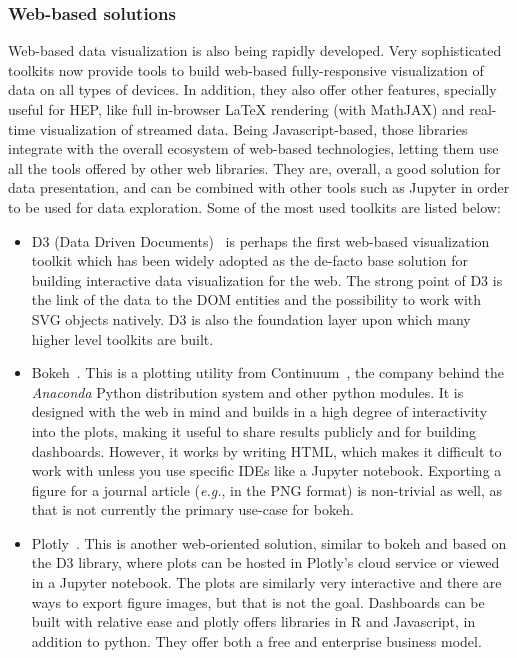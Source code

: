 \documentclass[12pt,a4paper]{article}
\begin{document}
\hypertarget{stats-web}{%
\subsubsection{Web-based solutions}\label{stats-web}}

Web-based data visualization is also being rapidly developed. Very sophisticated toolkits now provide tools to build web-based
fully-responsive visualization of data on all types of devices. In addition, they also offer other features, specially useful
for HEP, like full in-browser LaTeX rendering (with MathJAX) and real-time visualization of streamed data. Being Javascript-based,
those libraries integrate with the overall ecosystem of web-based technologies, letting them use all the tools offered by other
web libraries. They are, overall, a good solution for data presentation, and can be combined with other tools such as Jupyter
in order to be used for data exploration. Some of the most used toolkits are listed below:

\begin{itemize}
\item D3 (Data Driven Documents)~\cite{D32011} is perhaps the first web-based visualization toolkit which has been widely
adopted as the de-facto base solution for building interactive data visualization for the web. The strong point of D3 is the
link of the data to the DOM entities and the possibility to work with SVG objects natively. D3 is also the foundation layer
upon which many higher level toolkits are built.

\item Bokeh~\cite{Bokeh2014}. This is a plotting utility from Continuum~\cite{continuum}, the company behind the
\textit{Anaconda} Python distribution system and other python modules. It is designed with the web in mind and builds in a high degree of
interactivity into the plots, making it useful to share results publicly and for building dashboards. However, it works by
writing HTML, which makes it difficult to work with unless you use specific IDEs like a Jupyter notebook. Exporting a figure
for a journal article ({\it e.g.}, in the PNG format) is non-trivial as well, as that is not currently the primary use-case for bokeh.

\item Plotly~\cite{Plotly2015}. This is another web-oriented solution, similar to bokeh and based on the D3 library, where plots
can be hosted in Plotly’s cloud service or viewed in a Jupyter notebook. The plots are similarly very interactive and there
are ways to export figure images, but that is not the goal. Dashboards can be built with relative ease and plotly offers
libraries in R and Javascript, in addition to python. They offer both a free and enterprise business model.
\end{itemize}
\end{document}
